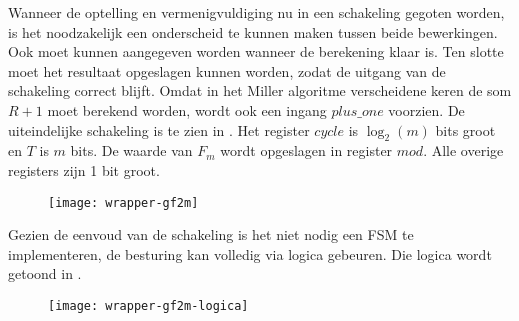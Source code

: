 Wanneer de optelling en vermenigvuldiging nu in een schakeling gegoten worden, is het noodzakelijk een onderscheid te kunnen maken tussen beide bewerkingen. Ook moet kunnen aangegeven worden wanneer de berekening klaar is. Ten slotte moet het resultaat opgeslagen kunnen worden, zodat de uitgang van de schakeling correct blijft. Omdat in het Miller algoritme verscheidene keren de som $R + 1$ moet berekend worden, wordt ook een ingang $plus\_one$ voorzien. De uiteindelijke schakeling is te zien in . Het register $cycle$ is $\log _2 (m)$ bits groot en $T$ is $m$ bits. De waarde van $F_m$ wordt opgeslagen in register $mod$. Alle overige registers zijn 1 bit groot.

\begin{figure}[h]
	\begin{center}
		\texttt{[image: wrapper-gf2m]}
		\label{figuur-implementatie-wrapper-gf2m}
	\end{center}
\end{figure}

Gezien de eenvoud van de schakeling is het niet nodig een FSM te implementeren, de besturing kan volledig via logica gebeuren. Die logica wordt getoond in .

\begin{figure}[h]
	\begin{center}
		\texttt{[image: wrapper-gf2m-logica]}
		\label{figuur-implementatie-wrapper-gf2m-logica}
	\end{center}
\end{figure}




